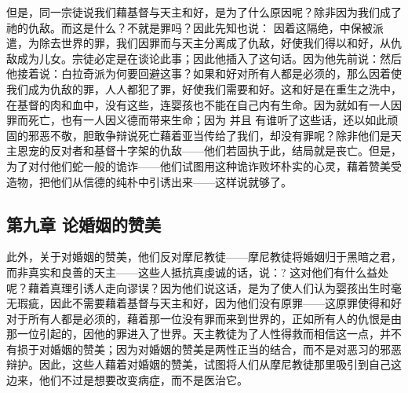 但是，同一宗徒说我们藉基督与天主和好，是为了什么原因呢？除非因为我们成了祂的仇敌。而这是什么？不就是罪吗？因此先知也说： 因着这隔绝，中保被派遣，为除去世界的罪，我们因罪而与天主分离成了仇敌，好使我们得以和好，从仇敌成为儿女。宗徒必定是在谈论此事；因此他插入了这句话。因为他先前说：然后他接着说：白拉奇派为何要回避这事？如果和好对所有人都是必须的，那么因着使我们成为仇敌的罪，人人都犯了罪，好使我们需要和好。这和好是在重生之洗中，在基督的肉和血中，没有这些，连婴孩也不能在自己内有生命。因为就如有一人因罪而死亡，也有一人因义德而带来生命；因为 并且 有谁听了这些话，还以如此顽固的邪恶不敬，胆敢争辩说死亡藉着亚当传给了我们，却没有罪呢？除非他们是天主恩宠的反对者和基督十字架的仇敌——他们若固执于此，结局就是丧亡。但是，为了对付他们蛇一般的诡诈——他们试图用这种诡诈败坏朴实的心灵，藉着赞美受造物，把他们从信德的纯朴中引诱出来——这样说就够了。\par


\subsection{第九章 论婚姻的赞美}

此外，关于对婚姻的赞美，他们反对摩尼教徒——摩尼教徒将婚姻归于黑暗之君，而非真实和良善的天主——这些人抵抗真虔诚的话，说：?  这对他们有什么益处呢？藉着真理引诱人走向谬误？因为他们说这话，是为了使人们认为婴孩出生时毫无瑕疵，因此不需要藉着基督与天主和好，因为他们没有原罪——这原罪使得和好对于所有人都是必须的，藉着那一位没有罪而来到世界的，正如所有人的仇恨是由那一位引起的，因他的罪进入了世界。天主教徒为了人性得救而相信这一点，并不有损于对婚姻的赞美；因为对婚姻的赞美是两性正当的结合，而不是对恶习的邪恶辩护。因此，这些人藉着对婚姻的赞美，试图将人们从摩尼教徒那里吸引到自己这边来，他们不过是想要改变病症，而不是医治它。\par

